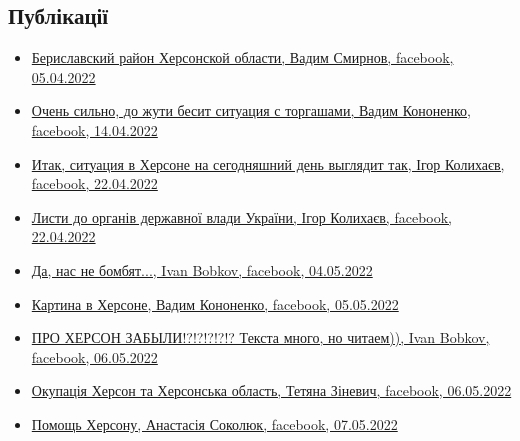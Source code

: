  
 
 
 
 
\subsection{Публікації}

\begin{itemize} %

\item \hyperlink{05_04_2022.fb.smirnov_vadim.odessa.rieltor.1.berislav_rajon}{%
Бериславский район Херсонской области, Вадим Смирнов, facebook, 05.04.2022%
}

\item \hyperlink{14_04_2022.fb.kononenko_vadim.herson.1.torgashi}{%
Очень сильно, до жути бесит ситуация с торгашами, Вадим Кононенко, facebook, 14.04.2022%
}

\item \hyperlink{22_04_2022.fb.kolyhaev_igor.herson.mer.1.herson}{%
Итак, ситуация в Херсоне на сегодняшний день выглядит так, Ігор Колихаєв, facebook, 22.04.2022%
}

\item \hyperlink{26_04_2022.fb.kolyhaev_igor.herson.mer.1.lysty}{%
Листи до органів державної влади України, Ігор Колихаєв, facebook, 22.04.2022%
}

\item \hyperlink{04_05_2022.fb.bobkov_ivan.1.nas_ne_bombjat}{%
Да, нас не бомбят..., Ivan Bobkov, facebook, 04.05.2022%
}

\item \hyperlink{05_05_2022.fb.kononenko_vadim.herson.1.kartina_v_hersone}{%
Картина в Херсоне, Вадим Кононенко, facebook, 05.05.2022%
}

\item \hyperlink{06_05_2022.fb.bobkov_ivan.1.pro_herson_zabyli}{%
ПРО ХЕРСОН ЗАБЫЛИ!?!?!?!?!?  Текста много, но читаем)), Ivan Bobkov, facebook, 06.05.2022%
}

\item \hyperlink{06_05_2022.fb.zinevich_tetjana.herson.1.okupacia}{%
Окупація Херсон та Херсонська область, Тетяна Зіневич, facebook, 06.05.2022%
}

\item \hyperlink{07_05_2022.fb.sokoljuk_anastasia.1.pomosch_hersonu}{%
Помощь Херсону, Анастасія Соколюк, facebook, 07.05.2022%
}

\end{itemize} %

